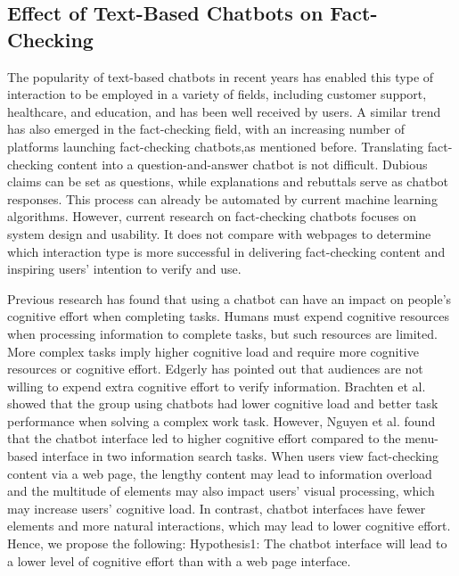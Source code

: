 \subsection{Effect of Text-Based Chatbots on Fact-Checking}
The popularity of text-based chatbots in recent years has enabled this type of interaction to be employed in a variety of fields, including customer support\cite[]{fiore2019forgot,nguyen2019potential}, healthcare\cite[]{huang2018chatbot,brixey2017shihbot}, and education\cite[]{hien2018intelligent,kasthuri2021chatbot}, and has been well received by users. 
A similar trend has also emerged in the fact-checking field, with an increasing number of platforms launching fact-checking chatbots,as mentioned before.
Translating fact-checking content into a question-and-answer chatbot is not difficult.
Dubious claims can be set as questions, while explanations and rebuttals serve as chatbot responses. 
This process can already be automated by current machine learning algorithms\cite[]{gupta2021dialfact,kotonya2020explainable}.
However, current research on fact-checking chatbots focuses on system design and usability. It does not compare with webpages to determine which interaction type is more successful in delivering fact-checking content and inspiring users' intention to verify and use.


Previous research has found that using a chatbot can have an impact on people's cognitive effort when completing tasks. Humans must expend cognitive resources when processing information to complete tasks, but such resources are limited. More complex tasks imply higher cognitive load and require more cognitive resources or cognitive effort. Edgerly has pointed out that audiences are not willing to expend extra cognitive effort to verify information. Brachten et al. showed that the group using chatbots had lower cognitive load and better task performance when solving a complex work task. However, Nguyen et al. found that the chatbot interface led to higher cognitive effort compared to the menu-based interface in two information search tasks. When users view fact-checking content via a web page, the lengthy content may lead to information overload and the multitude of elements may also impact users' visual processing, which may increase users' cognitive load. In contrast, chatbot interfaces have fewer elements and more natural interactions, which may lead to lower cognitive effort. Hence, we propose the following:
Hypothesis1:
The chatbot interface will lead to a lower level of cognitive effort than with a web page interface.




